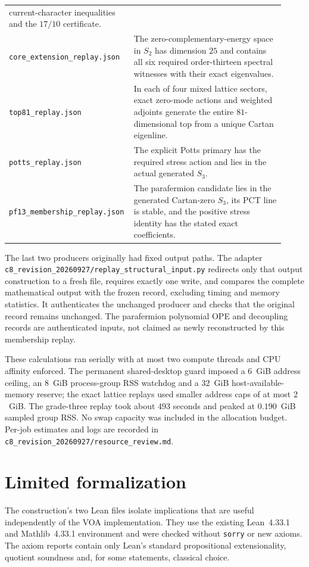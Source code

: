 \documentclass[11pt,a4paper]{article}
\theoremstyle{definition}
\newcommand{\artifact}[1]{\textnormal{\nolinkurl{#1}}}
\begin{document}
\begin{longtable}{@{}p{0.38\linewidth}p{0.54\linewidth}@{}}
current-character inequalities and the $17/10$ certificate.\\
\artifact{core_extension_replay.json} & The zero-complementary-energy
space in $S_2$ has dimension $25$ and contains all six required
order-thirteen spectral witnesses with their exact eigenvalues.\\
\artifact{top81_replay.json} & In each of four mixed lattice sectors,
exact zero-mode actions and weighted adjoints generate the entire
$81$-dimensional top from a unique Cartan eigenline.\\
\artifact{potts_replay.json} & The explicit Potts primary has the
required stress action and lies in the actual generated $S_3$.\\
\artifact{pf13_membership_replay.json} & The parafermion candidate
lies in the generated Cartan-zero $S_3$, its PCT line is stable,
and the positive stress identity has the stated exact coefficients.\\
\end{longtable}

The last two producers originally had fixed output paths. The adapter
\artifact{c8_revision_20260927/replay_structural_input.py} redirects
only that output construction to a fresh file, requires exactly one
write, and compares the complete mathematical output with the frozen
record, excluding timing and memory statistics. It authenticates the
unchanged producer and checks that the original record remains unchanged.
The parafermion polynomial OPE and decoupling records are authenticated
inputs, not claimed as newly reconstructed by this membership replay.

These calculations ran serially with at most two compute threads and
CPU affinity enforced. The permanent shared-desktop guard imposed
a $6$~GiB address ceiling, an $8$~GiB process-group RSS watchdog and
a $32$~GiB host-available-memory reserve; the exact lattice replays
used smaller address caps of at most $2$~GiB. The grade-three replay
took about $493$ seconds and peaked at $0.190$~GiB sampled group RSS.
No swap capacity was included in the allocation budget. Per-job
estimates and logs are recorded in
\artifact{c8_revision_20260927/resource_review.md}.

\section{Limited formalization}\label{sec:formalization}
The construction's two Lean files isolate implications that are useful independently
of the VOA implementation. They use the existing Lean~4.33.1 and
Mathlib~4.33.1 environment and were checked without \texttt{sorry} or
new axioms. The axiom reports contain only Lean's standard
propositional extensionality, quotient soundness and, for some
statements, classical choice.
\end{document}
